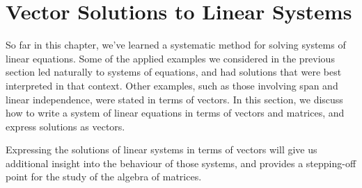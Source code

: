 

\section{Vector Solutions to Linear Systems}\label{sec:vector_solutions}




So far in this chapter, we've learned a systematic method for solving systems of linear equations. Some of the applied examples we considered in the previous section led naturally to systems of equations, and had solutions that were best interpreted in that context. Other examples, such as those involving span and linear independence, were stated in terms of vectors. In this section, we discuss how to write a system of linear equations in terms of vectors and matrices, and express solutions as vectors. 


Expressing the solutions of linear systems in terms of vectors will give us additional insight into the behaviour of those systems, and provides a stepping-off point for the study of the algebra of matrices. %

